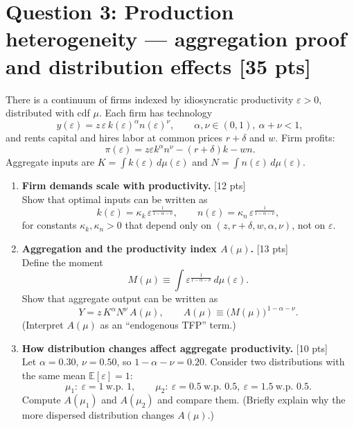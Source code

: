 \documentclass[12pt]{article}
\newcommand{\pts}[1]{\hfill{\small[#1 pts]}}
\newcommand{\E}{\mathbb{E}}
\begin{document}
\section*{Question 3: Production heterogeneity --- aggregation proof and distribution effects \pts{35}}

There is a continuum of firms indexed by idiosyncratic productivity \(\varepsilon>0\), distributed with cdf \(\mu\).
Each firm has technology
\[
y(\varepsilon)= z\,\varepsilon\, k(\varepsilon)^{\alpha} n(\varepsilon)^{\nu},
\qquad \alpha,\nu\in(0,1),\ \alpha+\nu<1,
\]
and rents capital and hires labor at common prices \(r+\delta\) and \(w\).
Firm profits:
\[
\pi(\varepsilon)= z\varepsilon k^\alpha n^\nu - (r+\delta)k - wn.
\]
Aggregate inputs are \(K=\int k(\varepsilon)\,d\mu(\varepsilon)\) and \(N=\int n(\varepsilon)\,d\mu(\varepsilon)\).

\begin{enumerate}[label=(\alph*)]
\item \textbf{Firm demands scale with productivity.} \pts{12}\\
Show that optimal inputs can be written as
\[
k(\varepsilon)=\kappa_k \,\varepsilon^{\frac{1}{1-\alpha-\nu}},
\qquad
n(\varepsilon)=\kappa_n \,\varepsilon^{\frac{1}{1-\alpha-\nu}},
\]
for constants \(\kappa_k,\kappa_n>0\) that depend only on \((z,r+\delta,w,\alpha,\nu)\), not on \(\varepsilon\).

\item \textbf{Aggregation and the productivity index \(A(\mu)\).} \pts{13}\\
Define the moment
\[
M(\mu)\equiv \int \varepsilon^{\frac{1}{1-\alpha-\nu}}\,d\mu(\varepsilon).
\]
Show that aggregate output can be written as
\[
Y = z\,K^{\alpha}N^{\nu}\,A(\mu),
\qquad
A(\mu)\equiv \Big(M(\mu)\Big)^{\,1-\alpha-\nu}.
\]
(Interpret \(A(\mu)\) as an ``endogenous TFP'' term.)

\item \textbf{How distribution changes affect aggregate productivity.} \pts{10}\\
Let \(\alpha=0.30\), \(\nu=0.50\), so \(1-\alpha-\nu=0.20\).
Consider two distributions with the same mean \(\E[\varepsilon]=1\):
\[
\mu_1:\ \varepsilon=1\ \text{w.p. }1,
\qquad
\mu_2:\ \varepsilon=0.5\ \text{w.p. }0.5,\ \varepsilon=1.5\ \text{w.p. }0.5.
\]
Compute \(A(\mu_1)\) and \(A(\mu_2)\) and compare them.
(Briefly explain why the more dispersed distribution changes \(A(\mu)\).)
\end{enumerate}
\end{document}
